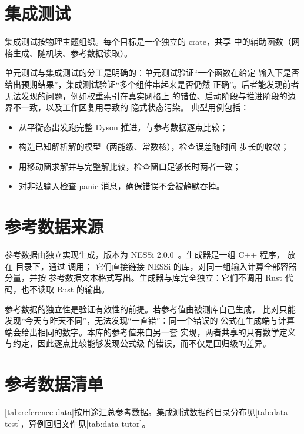 \section{集成测试}
\label{sec:integration-tests}

集成测试按物理主题组织。每个目标是一个独立的 crate，共享
 中的辅助函数（网格生成、随机块、参考数据读取）。

单元测试与集成测试的分工是明确的：单元测试验证“一个函数在给定
输入下是否给出预期结果”，集成测试验证“多个组件串起来是否仍然
正确”。后者能发现前者无法发现的问题，例如权重索引在真实网格上
的错位、启动阶段与推进阶段的边界不一致，以及工作区复用导致的
隐式状态污染。
典型用例包括：
\begin{itemize}
    \item 从平衡态出发跑完整 Dyson 推进，与参考数据逐点比较；
    \item 构造已知解析解的模型（两能级、常数核），检查误差随时间
          步长的收敛；
    \item 用移动窗求解并与完整解比较，检查窗口足够长时两者一致；
    \item 对非法输入检查 panic 消息，确保错误不会被静默吞掉。
\end{itemize}

\section{参考数据来源}
\label{sec:reference-source}

参考数据由独立实现生成，版本为 NESSi 2.0.0~\cite{eckstein2023}。生成器是一组 C++ 程序，
放在  目录下，通过  调用；
它们直接链接 NESSi 的库，对同一组输入计算全部容器分量，并按
参考数据文本格式写出。生成器与库完全独立：它们不调用 Rust
代码，也不读取 Rust 的输出。

参考数据的独立性是验证有效性的前提。若参考值由被测库自己生成，
比对只能发现“今天与昨天不同”，无法发现“一直错”：同一个错误的
公式在生成端与计算端会给出相同的数字。本库的参考值来自另一套
实现，两者共享的只有数学定义与约定，因此逐点比较能够发现公式级
的错误，而不仅是回归级的差异。

\section{参考数据清单}
\label{sec:reference-list}

\cref{tab:reference-data}按用途汇总参考数据。集成测试数据的目录分布见\cref{tab:data-test}，算例回归文件见\cref{tab:data-tutor}。

